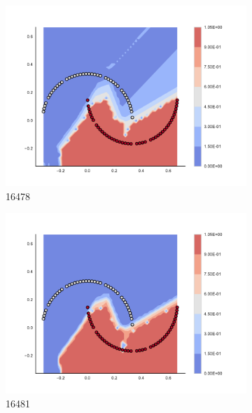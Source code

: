 \begin{figure}[h]
\begin{subfigure}[b]{0.09\textwidth}
    \includegraphics[clip, trim=2.35cm 1.75cm 4.5cm 0cm,width=\textwidth]{img/convergence/16478.pdf}
    \caption{16478}
    \label{fig:convergence_16478}
\end{subfigure}
%
\begin{subfigure}[b]{0.09\textwidth}
    \includegraphics[clip, trim=2.35cm 1.75cm 4.5cm 0cm,width=\textwidth]{img/convergence/16481.pdf}
    \caption{16481}
    \label{fig:convergence_16481}
\end{subfigure}
%
\begin{subfigure}[b]{0.09\textwidth}

\end{subfigure}
\end{figure}
